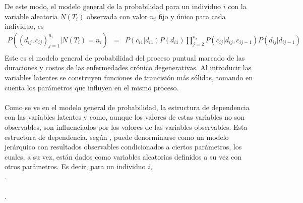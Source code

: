 De este modo, el modelo general de la probabilidad para un individuo $i$ con la variable aleatoria $N(T_i)$ observada con valor $n_i$ fijo y \'unico para cada individuo, es
\begin{eqnarray*}
P((d_{ij},c_{ij})_{j=1}^{n_i}|N(T_i)=n_i)&=& P(c_{i1}|d_{i1})P(d_{i1}) \prod_{j=2}^{n_i} P(c_{ij}|d_{ij},c_{ij-1})P(d_{ij}|d_{ij-1})\\%
\end{eqnarray*}
Este es el modelo general de probabilidad del proceso puntual marcado de las duraciones y costos de las enfermedades cr\'onico degenerativas. Al introducir las variables latentes se construyen funciones de trancisi\'on m\'as s\'olidas, tomando en cuenta los par\'ametros que influyen en el mismo proceso.\\
\\
Como se ve en el modelo general de probabilidad, la estructura de dependencia con las variables latentes y como, aunque los valores de estas variables no son observables, son influenciados por los valores de las variables observables. Esta estructura de dependencia, seg\'un \cite{gelman2014bayesian}, puede denorminarse como un modelo jer\'arquico con resultados observables condicionados a ciertos par\'ametros, los cuales, a su vez, est\'an dados como variables aleatorias definidos a su vez con otros par\'ametros. Es decir, para un individuo $i$, \\
.\\
\\
.\\
\\
